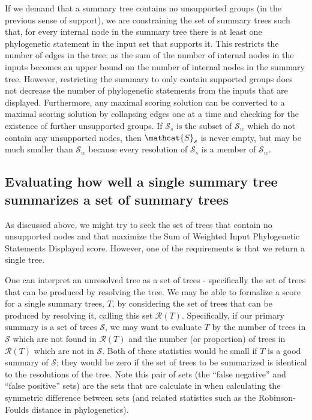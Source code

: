 \documentclass[11pt]{article}
\newcommand{\ps}{phylogenetic statement\xspace}
\newcommand{\pss}{phylogenetic statements\xspace}
\newcommand{\PSs}{Phylogenetic Statements\xspace}
\newcommand{\SWIPSD}{Sum of Weighted Input \PSs Displayed\xspace}
\begin{document}
If we demand that a summary tree contains no unsupported groups (in the previous sense of support), we 
    are constraining the set of summary trees such that, for every internal node in the summary tree
    there is at least one \ps in the input set that supports it.
This restricts the number of edges in the tree: as the sum of the number of internal nodes in the inputs becomes an upper bound
    on the number of internal nodes in the summary tree.
However, restricting the summary to only contain supported groups does not decrease the 
    number of \pss from the inputs that are displayed.
Furthermore, any maximal scoring solution can be converted to a maximal scoring
    solution by collapsing edges one at a time and checking for the existence of further
    unsupported groups.
If $\mathcal{S}_s$ is the subset of $\mathcal{S}_w$ which do not contain any unsupported nodes,
    then $\mathcat{S}_s$ is never empty, but may be much smaller than $\mathcal{S}_w$ because
    every resolution of $\mathcal{S}_s$ is a member of $\mathcal{S}_w$.

\subsection{Evaluating how well a single summary tree summarizes a set of summary trees}\label{treeAdmissibility}
As discussed above, we might try to seek the set of trees that contain no unsupported nodes and that
    maximize the \SWIPSD score.
However, one of the requirements is that we return a single tree.

One can interpret an unresolved tree as a set of trees - specifically the set of trees that 
    can be produced by resolving the tree.
We may be able to formalize a score for a single summary trees, $T$, by considering
    the set of trees that can be produced by resolving it, calling this set $\mathcal{R}(T)$.
Specifically, if our primary summary is a set of trees $\mathcal{S}$, we may want
    to evaluate $T$ by the number of trees in $\mathcal{S}$ which are not found
    in $\mathcal{R}(T)$ 
    and the number (or proportion) of trees in $\mathcal{R}(T)$ which
    are not in $\mathcal{S}$.
Both of these statistics would be small if $T$ is a good summary of $\mathcal{S}$; they 
    would be zero if the set of trees to be summarized is identical to the resolutions
    of the tree.
Note this pair of sets (the ``false negative'' and ``false positive'' sets) are the
    sets that are calculate in when calculating the symmetric difference between 
    sets (and related statistics such as the Robinson-Foulds distance in phylogenetics).
\end{document}
